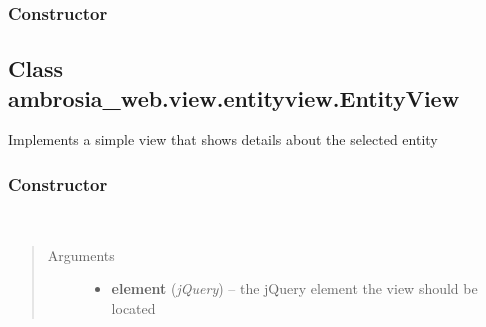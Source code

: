 \documentclass[letterpaper,10pt,english]{sphinxmanual}
\begin{document}
\subsubsection{Constructor}
\label{ambrosia_web.view.entityview:constructor}

\begin{fulllineitems}
\label{ambrosia_web.view.entityview:ambrosia_web.view.entityview}
\end{fulllineitems}



\subsection{Class ambrosia\_web.view.entityview.EntityView}
\label{ambrosia_web.view.entityview.EntityView:class-ambrosia-web-view-entityview-entityview}\label{ambrosia_web.view.entityview.EntityView::doc}
Implements a simple view that shows details about the selected entity


\subsubsection{Constructor}
\label{ambrosia_web.view.entityview.EntityView:constructor}

\begin{fulllineitems}
\label{ambrosia_web.view.entityview.EntityView:ambrosia_web.view.entityview.EntityView}~\begin{quote}\begin{description}
\item[{Arguments}] \leavevmode\begin{itemize}
\item {} 
\textbf{element} (\emph{jQuery}) -- the jQuery element the view should be located

\end{itemize}

\end{description}\end{quote}

\end{fulllineitems}
\end{document}
